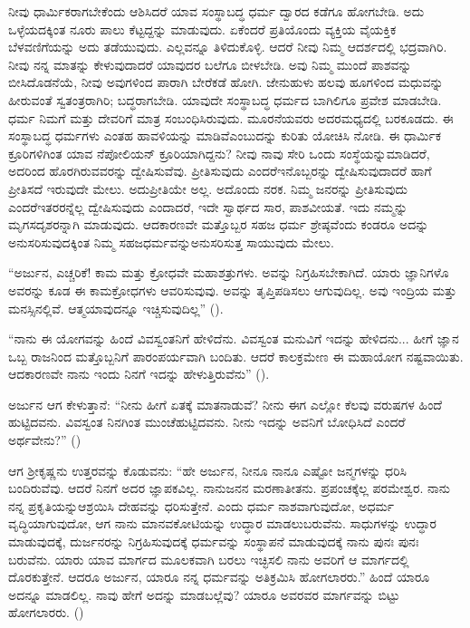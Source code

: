 ನೀವು ಧಾರ್ಮಿಕರಾಗಬೇಕೆಂದು ಆಶಿಸಿದರೆ ಯಾವ ಸಂಸ್ಥಾಬದ್ಧ ಧರ್ಮ ದ್ವಾರದ ಕಡೆಗೂ ಹೋಗಬೇಡಿ. ಅದು ಒಳ್ಳೆಯದಕ್ಕಿಂತ ನೂರು ಪಾಲು ಕೆಟ್ಟದ್ದನ್ನು ಮಾಡುವುದು. ಏಕೆಂದರೆ ಪ್ರತಿಯೊಂದು ವ್ಯಕ್ತಿಯ ವೈಯಕ್ತಿಕ ಬೆಳವಣಿಗೆಯನ್ನು ಅದು ತಡೆಯುವುದು. ಎಲ್ಲವನ್ನೂ ತಿಳಿದುಕೊಳ್ಳಿ. ಆದರೆ ನೀವು ನಿಮ್ಮ ಆದರ್ಶದಲ್ಲಿ ಭದ್ರವಾಗಿರಿ. ನೀವು ನನ್ನ ಮಾತನ್ನು ಕೇಳುವುದಾದರೆ ಯಾವುದರ ಬಲೆಗೂ ಬೀಳಬೇಡಿ. ಅವು ನಿಮ್ಮ ಮುಂದೆ ಪಾಶವನ್ನು ಬೀಸಿದೊಡನೆಯೆ, ನೀವು ಅವುಗಳಿಂದ ಪಾರಾಗಿ ಬೇರೆಕಡೆ ಹೋಗಿ. ಜೇನುಹುಳು ಹಲವು ಹೂಗಳಿಂದ ಮಧುವನ್ನು ಹೀರುವಂತೆ ಸ್ವತಂತ್ರರಾಗಿರಿ; ಬದ್ಧರಾಗಬೇಡಿ. ಯಾವುದೇ ಸಂಸ್ಥಾಬದ್ಧ ಧರ್ಮದ ಬಾಗಿಲಿಗೂ ಪ್ರವೇಶ ಮಾಡಬೇಡಿ. ಧರ್ಮ ನಿಮಗೆ ಮತ್ತು ದೇವರಿಗೆ ಮಾತ್ರ ಸಂಬಂಧಿಸಿರುವುದು. ಮೂರನೆಯವರು ಅದರ\break ಮಧ್ಯದಲ್ಲಿ ಬರಕೂಡದು. ಈ ಸಂಸ್ಥಾಬದ್ಧ ಧರ್ಮಗಳು ಎಂತಹ ಹಾವಳಿಯನ್ನು ಮಾಡಿವೆ\break ಎಂಬುದನ್ನು ಕುರಿತು ಯೋಚಿಸಿ ನೋಡಿ. ಈ ಧಾರ್ಮಿಕ ಕ್ರೂರಿಗಳಿಗಿಂತ ಯಾವ ನೆಪೋಲಿಯನ್ ​ಕ್ರೂರಿಯಾಗಿದ್ದನು? ನೀವು ನಾವು ಸೇರಿ ಒಂದು ಸಂಸ್ಥೆಯನ್ನು\break ಮಾಡಿದರೆ, ಅದರಿಂದ ಹೊರಗಿರುವವರನ್ನು ದ್ವೇಷಿಸುವೆವು. ಪ್ರೀತಿಸುವುದು ಎಂದರೆ\break ಇನೊಬ್ಬರನ್ನು ದ್ವೇಷಿಸುವುದಾದರೆ ಹಾಗೆ ಪ್ರೀತಿಸದೆ ಇರುವುದೇ ಮೇಲು. ಅದು\break ಪ್ರೀತಿಯೇ ಅಲ್ಲ. ಅದೊಂದು ನರಕ. ನಿಮ್ಮ ಜನರನ್ನು ಪ್ರೀತಿಸುವುದು ಎಂದರೆ\break ಇತರರನ್ನೆಲ್ಲ ದ್ವೇಷಿಸುವುದು ಎಂದಾದರೆ, ಇದೇ ಸ್ವಾರ್ಥದ ಸಾರ, ಪಾಶವೀಯತೆ. ಇದು ನಮ್ಮನ್ನು ಮೃಗಸದೃಶರನ್ನಾಗಿ ಮಾಡುವುದು. ಆದಕಾರಣವೇ ಮತ್ತೊಬ್ಬರ ಸಹಜ ಧರ್ಮ ಶ್ರೇಷ್ಠವೆಂದು ಕಂಡರೂ ಅದನ್ನು ಅನುಸರಿಸುವುದಕ್ಕಿಂತ ನಿಮ್ಮ ಸಹಜಧರ್ಮವನ್ನು\break ಅನುಸರಿಸುತ್ತ ಸಾಯುವುದು ಮೇಲು.

“ಅರ್ಜುನ, ಎಚ್ಚರಿಕೆ! ಕಾಮ ಮತ್ತು ಕ್ರೋಧವೇ ಮಹಾಶತ್ರುಗಳು. ಅವನ್ನು ನಿಗ್ರಹಿಸಬೇಕಾಗಿದೆ. ಯಾರು ಜ್ಞಾನಿಗಳೊ ಅವರನ್ನು ಕೂಡ ಈ ಕಾಮಕ್ರೋಧಗಳು ಆವರಿಸುವುವು. ಅವನ್ನು ತೃಪ್ತಿಪಡಿಸಲು ಆಗುವುದಿಲ್ಲ. ಅವು ಇಂದ್ರಿಯ ಮತ್ತು ಮನಸ್ಸಿನಲ್ಲಿವೆ. ಆತ್ಮ\break ಯಾವುದನ್ನೂ ಇಚ್ಚಿಸುವುದಿಲ್ಲ” ().

“ನಾನು ಈ ಯೋಗವನ್ನು ಹಿಂದೆ ವಿವಸ್ವಂತನಿಗೆ ಹೇಳಿದೆನು. ವಿವಸ್ವಂತ ಮನುವಿಗೆ ಇದನ್ನು ಹೇಳಿದನು... ಹೀಗೆ ಜ್ಞಾನ ಒಬ್ಬ ರಾಜನಿಂದ ಮತ್ತೊಬ್ಬನಿಗೆ ಪಾರಂಪರ್ಯವಾಗಿ ಬಂದಿತು. ಆದರೆ ಕಾಲಕ್ರಮೇಣ ಈ ಮಹಾಯೋಗ ನಷ್ಟವಾಯಿತು. ಆದಕಾರಣವೇ ನಾನು ಇಂದು ನಿನಗೆ ಇದನ್ನು ಹೇಳುತ್ತಿರುವೆನು” ().

ಅರ್ಜುನ ಆಗ ಕೇಳುತ್ತಾನೆ: “ನೀನು ಹೀಗೆ ಏತಕ್ಕೆ ಮಾತನಾಡುವೆ? ನೀನು ಈಗ ಎಲ್ಲೋ ಕೆಲವು ವರುಷಗಳ ಹಿಂದೆ ಹುಟ್ಟಿದವನು. ವಿವಸ್ವಂತ ನಿನಗಿಂತ ಮುಂಚೆ\break ಹುಟ್ಟಿದವನು. ನೀನು ಇದನ್ನು ಅವನಿಗೆ ಬೋಧಿಸಿದೆ ಎಂದರೆ ಅರ್ಥವೇನು?” ()

ಆಗ ಶ‍್ರೀಕೃಷ್ಣನು ಉತ್ತರವನ್ನು ಕೊಡುವನು: “ಹೇ ಅರ್ಜುನ, ನೀನೂ ನಾನೂ ಎಷ್ಟೋ ಜನ್ಮಗಳನ್ನು ಧರಿಸಿ ಬಂದಿರುವೆವು. ಆದರೆ ನಿನಗೆ ಅದರ ಜ್ಞಾಪಕವಿಲ್ಲ. ನಾನು\break ಜನನ ಮರಣಾತೀತನು. ಪ್ರಪಂಚಕ್ಕೆಲ್ಲ ಪರಮೇಶ್ವರ. ನಾನು ನನ್ನ ಪ್ರಕೃತಿಯನ್ನು\break ಆಶ್ರಯಿಸಿ ದೇಹವನ್ನು ಧರಿಸುತ್ತೇನೆ. ಎಂದು ಧರ್ಮ ನಾಶವಾಗುವುದೋ, ಅಧರ್ಮ ವೃದ್ಧಿಯಾಗುವುದೋ, ಆಗ ನಾನು ಮಾನವಕೋಟಿಯನ್ನು ಉದ್ಧಾರ ಮಾಡಲು\break ಬರುವೆನು. ಸಾಧುಗಳನ್ನು ಉದ್ಧಾರ ಮಾಡುವುದಕ್ಕೆ, ದುರ್ಜನರನ್ನು ನಿಗ್ರಹಿಸುವುದಕ್ಕೆ ಧರ್ಮವನ್ನು ಸಂಸ್ಥಾಪನೆ ಮಾಡುವುದಕ್ಕೆ ನಾನು ಪುನಃ ಪುನಃ ಬರುವೆನು. ಯಾರು ಯಾವ ಮಾರ್ಗದ ಮೂಲಕವಾಗಿ ಬರಲು ಇಚ್ಛಿಸಲಿ ನಾನು ಅವರಿಗೆ ಆ ಮಾರ್ಗದಲ್ಲಿ ದೊರಕುತ್ತೇನೆ. ಆದರೂ ಅರ್ಜುನ, ಯಾರೂ ನನ್ನ ಧರ್ಮವನ್ನು ಅತಿಕ್ರಮಿಸಿ ಹೋಗಲಾರರು.” ಹಿಂದೆ ಯಾರೂ ಅದನ್ನೂ ಮಾಡಲಿಲ್ಲ. ನಾವು ಹೇಗೆ ಅದನ್ನು ಮಾಡಬಲ್ಲೆವು? ಯಾರೂ ಅವರವರ ಮಾರ್ಗವನ್ನು ಬಿಟ್ಟು ಹೋಗಲಾರರು. ()

